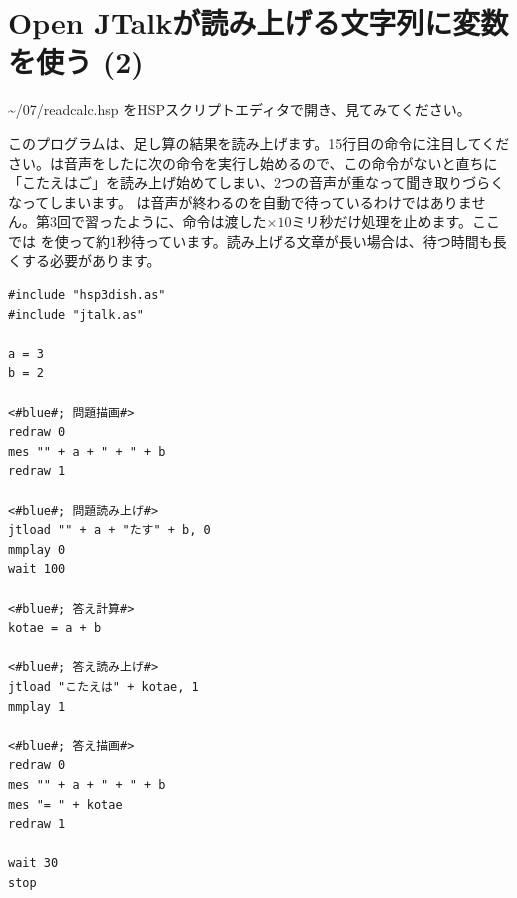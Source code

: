 \documentclass[text06.tex]{subfiles}
\begin{document}
\newpage
\section{Open JTalkが読み上げる文字列に変数を使う (2)}
 \textasciitilde /07/\mbox{readcalc.hsp} をHSPスクリプトエディタで開き、見てみてください。

このプログラムは、足し算の結果を読み上げます。15行目の命令に注目してください。は音声をしたに次の命令を実行し始めるので、この命令がないと直ちに「こたえはご」を読み上げ始めてしまい、2つの音声が重なって聞き取りづらくなってしまいます。
は音声が終わるのを自動で待っているわけではありません。第3回で習ったように、命令は渡した$\times 10$ミリ秒だけ処理を止めます。ここでは  を使って約1秒待っています。読み上げる文章が長い場合は、待つ時間も長くする必要があります。\\

\begin{lstlisting}[caption=readcalc.hsp,label=readcalc.hsp]
#include "hsp3dish.as"
#include "jtalk.as"

a = 3
b = 2

<#blue#; 問題描画#>
redraw 0
mes "" + a + " + " + b
redraw 1

<#blue#; 問題読み上げ#>
jtload "" + a + "たす" + b, 0
mmplay 0
wait 100

<#blue#; 答え計算#>
kotae = a + b

<#blue#; 答え読み上げ#>
jtload "こたえは" + kotae, 1
mmplay 1

<#blue#; 答え描画#>
redraw 0
mes "" + a + " + " + b
mes "= " + kotae
redraw 1

wait 30
stop
\end{lstlisting}

\begin{tcolorbox}[title=\useOmetoi]
\begin{enumerate}
\end{enumerate}
\end{tcolorbox}
\end{document}

